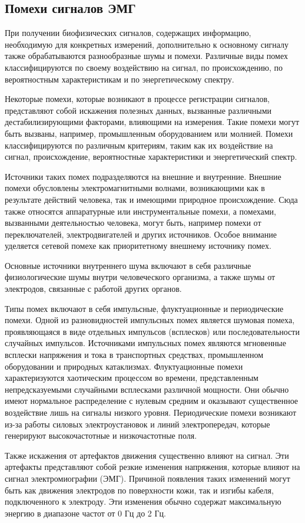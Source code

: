 \subsection{Помехи сигналов ЭМГ}

При получении биофизических сигналов, содержащих информацию, необходимую для конкретных измерений, дополнительно к основному сигналу также обрабатываются разнообразные шумы и помехи. Различные виды помех классифицируются по своему воздействию на сигнал, по происхождению, по вероятностным характеристикам и по энергетическому спектру.

Некоторые помехи, которые возникают в процессе регистрации сигналов, представляют собой искажения полезных данных, вызванные различными дестабилизирующими факторами, влияющими на измерения. Такие помехи могут быть вызваны, например, промышленным оборудованием или молнией. Помехи классифицируются по различным критериям, таким как их воздействие на сигнал, происхождение, вероятностные характеристики и энергетический спектр.

Источники таких помех подразделяются на внешние и внутренние. Внешние помехи обусловлены электромагнитными волнами, возникающими как в результате действий человека, так и имеющими природное происхождение. Сюда также относятся аппаратурные или инструментальные помехи, а помехами, вызванными деятельностью человека, могут быть, например помехи от переключателей, электродвигателей и других источников. Особое внимание уделяется сетевой помехе как приоритетному внешнему источнику помех.

Основные источники внутреннего шума включают в себя различные физиологические шумы внутри человеческого организма, а также шумы от электродов, связанные с работой других органов.

Типы помех включают в себя импульсные, флуктуационные и периодические помехи. Одной из разновидностей импульсных помех является шумовая помеха, проявляющаяся в виде отдельных импульсов (всплесков) или последовательности случайных импульсов. Источниками импульсных помех являются мгновенные всплески напряжения и тока в транспортных средствах, промышленном оборудовании и природных катаклизмах. Флуктуационные помехи характеризуются хаотическим процессом во времени, представленным непредсказуемыми случайными всплесками различной мощности. Они обычно имеют нормальное распределение с нулевым средним и оказывают существенное воздействие лишь на сигналы низкого уровня. Периодические помехи возникают из-за работы силовых электроустановок и линий электропередач, которые генерируют высокочастотные и низкочастотные поля.

Также искажения от артефактов движения существенно влияют на сигнал. Эти артефакты представляют собой резкие изменения напряжения, которые влияют на сигнал электромиографии (ЭМГ). Причиной появления таких изменений могут быть как движения электродов по поверхности кожи, так и изгибы кабеля, подключенного к электроду. Эти изменения обычно содержат максимальную энергию в диапазоне частот от 0 Гц до 2 Гц.
